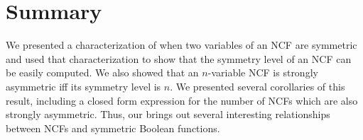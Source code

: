 \section{Summary}
\label{sec:summary}

We presented a characterization of when two variables
of an NCF are symmetric and used that characterization
to show that the symmetry level of an NCF can be easily computed.
We also showed that an $n$-variable NCF is strongly asymmetric
iff its symmetry level is $n$.
We presented several corollaries of this result, including
a closed form expression for the number of NCFs which are also
strongly asymmetric.
Thus, our brings out several interesting relationships 
between NCFs and symmetric Boolean functions.

